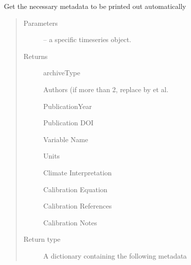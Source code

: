 \documentclass[letterpaper,10pt,english]{sphinxmanual}
\begin{document}
\begin{fulllineitems}
\label{\detokenize{SummaryPlots:pyleoclim.SummaryPlots.getMetadata}}
Get the necessary metadata to be printed out automatically
\begin{quote}\begin{description}
\item[{Parameters}] \leavevmode
{} -- a specific timeseries object.

\item[{Returns}] \leavevmode

archiveType

Authors (if more than 2, replace by et al.

PublicationYear

Publication DOI

Variable Name

Units

Climate Interpretation

Calibration Equation

Calibration References

Calibration Notes


\item[{Return type}] \leavevmode
A dictionary containing the following metadata

\end{description}\end{quote}

\end{fulllineitems}

\end{document}
